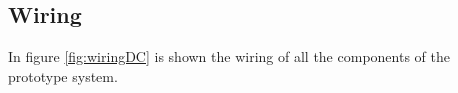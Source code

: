 \subsection{Wiring}
In figure \ref{fig:wiringDC} is shown the wiring of all the components of the prototype system.

